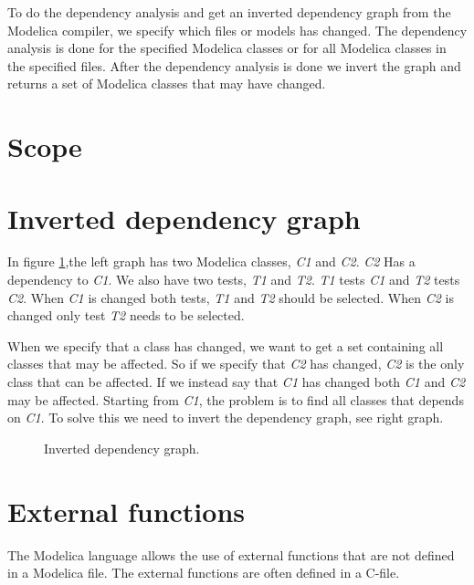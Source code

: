 \documentclass{cslthse-msc}
\begin{document}
To do the dependency analysis and get an inverted dependency graph from the Modelica compiler, we specify which files or models has changed. The dependency analysis is done for the specified Modelica classes or for all Modelica classes in the specified files. After the dependency analysis is done we invert the graph and returns a set of Modelica classes that may have changed.

\section{Scope}

\section{Inverted dependency graph}

In figure \ref{fig:invertedGraph},the left graph has two Modelica classes, \textit{C1} and \textit{C2}. \textit{C2} Has a dependency to \textit{C1}. We also have two tests, \textit{T1} and \textit{T2}. \textit{T1} tests \textit{C1} and \textit{T2} tests \textit{C2}. When \textit{C1} is changed both tests, \textit{T1} and \textit{T2} should be selected. When \textit{C2} is changed only test \textit{T2} needs to be selected.

When we specify that a class has changed, we want to get a set containing all classes that may be affected. So if we specify that \textit{C2} has changed, \textit{C2} is the only class that can be affected. If we instead say that \textit{C1} has changed both \textit{C1} and \textit{C2} may be affected. Starting from \textit{C1}, the problem is to find all classes that depends on \textit{C1}. To solve this we need to invert the dependency graph, see right graph.
\begin{figure}[!htbp]
    \centering
    \qquad
    \caption{Inverted dependency graph.}
    \label{fig:invertedGraph}
\end{figure}

\section{External functions}
The Modelica language allows the use of external functions that are not defined in a Modelica file. The external functions are often defined in a C-file.\cite{modelicamodelica}
\end{document}
